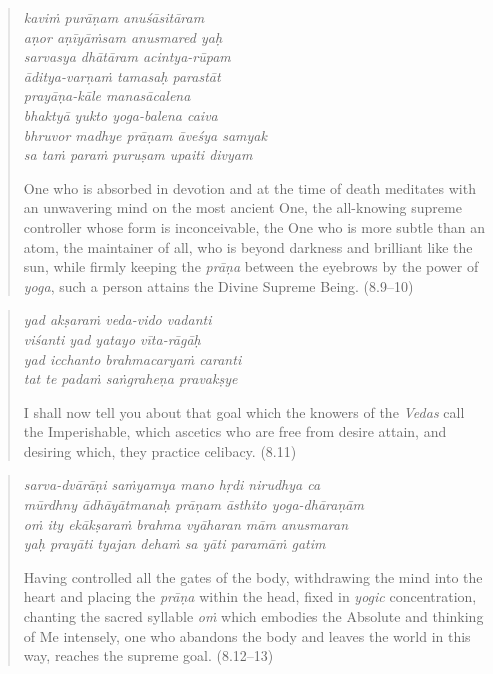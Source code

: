 \documentclass[12pt, twoside, openright]{memoir}
\begin{document}
\par
\begin{verse}
\textit{kaviṁ purāṇam anuśāsitāram} \\
\textit{aṇor aṇīyāṁsam anusmared yaḥ} \\
\textit{sarvasya dhātāram acintya-rūpam} \\
\textit{āditya-varṇaṁ tamasaḥ parastāt} \\
\textit{prayāṇa-kāle manasācalena} \\
\textit{bhaktyā yukto yoga-balena caiva} \\
\textit{bhruvor madhye prāṇam āveśya samyak} \\
\textit{sa taṁ paraṁ puruṣam upaiti divyam}

\noindent One who is absorbed in devotion and at the time of death meditates with an unwavering mind on the most ancient One, the all-knowing supreme controller whose form is inconceivable, the One who is more subtle than an atom, the maintainer of all, who is beyond darkness and brilliant like the sun, while firmly keeping the \textit{prāṇa} between the eyebrows by the power of \textit{yoga}, such a person attains the Divine Supreme Being. (8.9–10)
\end{verse}
\par



\par
\begin{verse}
\textit{yad akṣaraṁ veda-vido vadanti} \\
\textit{viśanti yad yatayo vīta-rāgāḥ} \\
\textit{yad icchanto brahmacaryaṁ caranti} \\
\textit{tat te padaṁ saṅgraheṇa pravakṣye}

\noindent I shall now tell you about that goal which the knowers of the \textit{Vedas} call the Imperishable, which ascetics who are free from desire attain, and desiring which, they practice celibacy. (8.11)
\end{verse}
\par



\par
\begin{verse}
\textit{sarva-dvārāṇi saṁyamya mano hṛdi nirudhya ca} \\
\textit{mūrdhny ādhāyātmanaḥ prāṇam āsthito yoga-dhāraṇām} \\
\textit{oṁ ity ekākṣaraṁ brahma vyāharan mām anusmaran} \\
\textit{yaḥ prayāti tyajan dehaṁ sa yāti paramāṁ gatim}

\noindent Having controlled all the gates of the body, withdrawing the mind into the heart and placing the \textit{prāṇa} within the head, fixed in \textit{yogic} concentration, chanting the sacred syllable \textit{oṁ} which embodies the Absolute and thinking of Me intensely, one who abandons the body and leaves the world in this way, reaches the supreme goal. (8.12–13)
\end{verse}
\par
\end{document}
